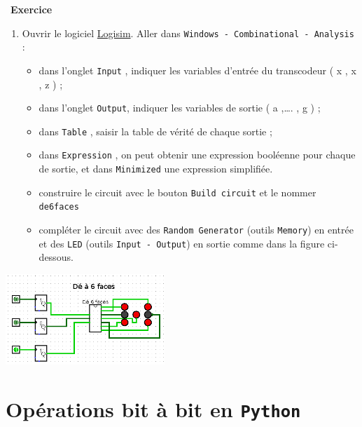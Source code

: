 \documentclass[
  11pt,
]{article}
\newcommand{\passthrough}[1]{#1}
\providecommand{\tightlist}{%
  \setlength{\itemsep}{0pt}\setlength{\parskip}{0pt}}
\newcounter{exo}
\newenvironment{exercice}[1]
{\par \medskip   \addtocounter{exo}{1} \noindent  
\begin{bclogo}[arrondi =0.1,   noborder = true, logo=\bccrayon, marge=4]{~\textbf{Exercice} \textbf{\theexo} {\itshape #1} }  \par}
{
\end{bclogo}
 \par \bigskip }
\newcounter{def}
\newcounter{logi}
\begin{document}
\begin{exercice}{}
\begin{enumerate}
\def\labelenumi{\arabic{enumi}.}
\setcounter{enumi}{1}
\tightlist
\item
  Ouvrir le logiciel \href{http://www.cburch.com/logisim/}{Logisim}.
  Aller dans
  \passthrough{\lstinline!Windows - Combinational - Analysis!} :

  \begin{itemize}
  \tightlist
  \item
    dans l'onglet \passthrough{\lstinline!Input!} , indiquer les
    variables d'entrée du transcodeur ( x , x , z ) ;
  \item
    dans l'onglet \passthrough{\lstinline!Output!}, indiquer les
    variables de sortie ( a ,\ldots. , g ) ;
  \item
    dans \passthrough{\lstinline!Table!} , saisir la table de vérité de
    chaque sortie ;
  \item
    dans \passthrough{\lstinline!Expression!} , on peut obtenir une
    expression booléenne pour chaque de sortie, et dans
    \passthrough{\lstinline!Minimized!} une expression simplifiée.
  \item
    construire le circuit avec le bouton
    \passthrough{\lstinline!Build circuit!} et le nommer
    \passthrough{\lstinline!de6faces!}
  \item
    compléter le circuit avec des
    \passthrough{\lstinline!Random Generator!} (outils
    \passthrough{\lstinline!Memory!}) en entrée et des
    \passthrough{\lstinline!LED!} (outils
    \passthrough{\lstinline!Input - Output!}) en sortie comme dans la
    figure ci-dessous.
  \end{itemize}
\end{enumerate}

\end{exercice}

\includegraphics[width=0.45\textwidth,height=\textheight]{images/de_6_faces.png}\\

\hypertarget{opuxe9rations-bit-uxe0-bit-en-python}{%
\section{\texorpdfstring{Opérations bit à bit en
\texttt{Python}}{Opérations bit à bit en Python}}\label{opuxe9rations-bit-uxe0-bit-en-python}}
\end{document}
